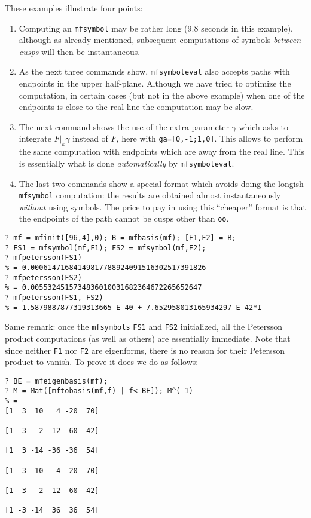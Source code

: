 \documentclass[11pt]{article}
\newcommand{\ga}{\gamma}
\def\kbd#1{{\tt #1}}
\begin{document}
These examples illustrate four points:
\begin{enumerate}\item Computing an \kbd{mfsymbol}
may be rather long ($9.8$ seconds in this example), although as already
mentioned, subsequent computations of symbols \emph{between cusps} will then
be instantaneous.
\item As the next three commands show, \kbd{mfsymboleval}
also accepts paths with endpoints in the upper half-plane. Although we
have tried to optimize the computation, in certain cases (but not in
the above example) when one of the endpoints is close to the real line
the computation may be slow.
\item The next command shows the use of the extra parameter $\ga$ which
asks to integrate $F|_k\ga$ instead of $F$, here with \kbd{ga=[0,-1;1,0]}.
This allows to perform the same computation with endpoints which are away
from the real line. This is essentially what is done \emph{automatically} by
\kbd{mfsymboleval}.
\item The last two commands show a special format which avoids doing the
longish \kbd{mfsymbol} computation: the results are obtained almost
instantaneously \emph{without} using symbols. The price to pay in using this
``cheaper'' format is that the endpoints of the path cannot be cusps other
than \kbd{oo}.
\end{enumerate}

\begin{verbatim}
? mf = mfinit([96,4],0); B = mfbasis(mf); [F1,F2] = B;
? FS1 = mfsymbol(mf,F1); FS2 = mfsymbol(mf,F2);
? mfpetersson(FS1)
% = 0.00061471684149817788924091516302517391826
? mfpetersson(FS2)
% = 0.0055324515734836010031682364672265652647
? mfpetersson(FS1, FS2)
% = 1.5879887877319313665 E-40 + 7.652958013165934297 E-42*I
\end{verbatim}

Same remark: once the \kbd{mfsymbols} \kbd{FS1} and \kbd{FS2} initialized,
all the Petersson product computations (as well as others) are essentially
immediate. Note that since neither \kbd{F1} nor \kbd{F2} are eigenforms,
there is no reason for their Petersson product to vanish. To prove it does
we do as follows:

\begin{verbatim}
? BE = mfeigenbasis(mf);
? M = Mat([mftobasis(mf,f) | f<-BE]); M^(-1)
% =
[1  3  10   4 -20  70]

[1  3   2  12  60 -42]

[1  3 -14 -36 -36  54]

[1 -3  10  -4  20  70]

[1 -3   2 -12 -60 -42]

[1 -3 -14  36  36  54]
\end{verbatim}
\end{document}
